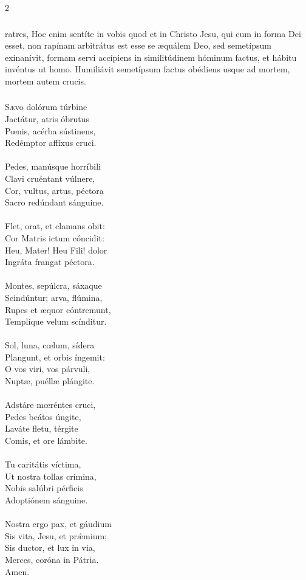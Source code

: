 \documentclass[9pt,twoside]{extarticle}
\begin{document}
\begin{multicols}{2}
\subsubsection*{}
ratres, Hoc enim sentíte in vobis quod et in Christo Jesu, qui cum in forma Dei esset, non rapínam arbitrátus est esse se æquálem Deo, sed semetípsum exinanívit, formam servi accípiens in similitúdinem hóminum factus, et hábitu invéntus ut homo. Humiliávit semetípsum factus obédiens usque ad mortem, mortem autem crucis.

\subsubsection*{\center {}}
\lettrine{S}ævo dolórum túrbine\\
Jactátur, atris óbrutus\\
Pœnis, acérba sústinens,\\
Redémptor affíxus cruci.\\
\\
Pedes, manúsque horríbili\\
Clavi cruéntant vúlnere,\\
Cor, vultus, artus, péctora\\
Sacro redúndant sánguine.\\
\\
Flet, orat, et clamans obit:\\
Cor Matris ictum cóncidit:\\
Heu, Mater! Heu Fili! dolor\\
Ingráta frangat péctora.\\
\\
Montes, sepúlcra, sáxaque\\
Scindúntur; arva, flúmina,\\
Rupes et æquor cóntremunt,\\
Templíque velum scínditur.\\
\\
Sol, luna, cœlum, sídera\\
Plangunt, et orbis íngemit:\\
O vos viri, vos párvuli,\\
Nuptæ, puéllæ plángite.\\
\\
Adstáre mœréntes cruci,\\
Pedes beátos úngite,\\
Laváte fletu, térgite\\
Comis, et ore lámbite.\\
\\
Tu caritátis víctima,\\
Ut nostra tollas crímina,\\
Nobis salúbri pérficis\\
Adoptiónem sánguine.\\
\\
Nostra ergo pax, et gáudium\\
Sis vita, Jesu, et prǽmium;\\
Sis ductor, et lux in via,\\
Merces, coróna in Pátria.\\
Amen.


\end{multicols}
\end{document}
